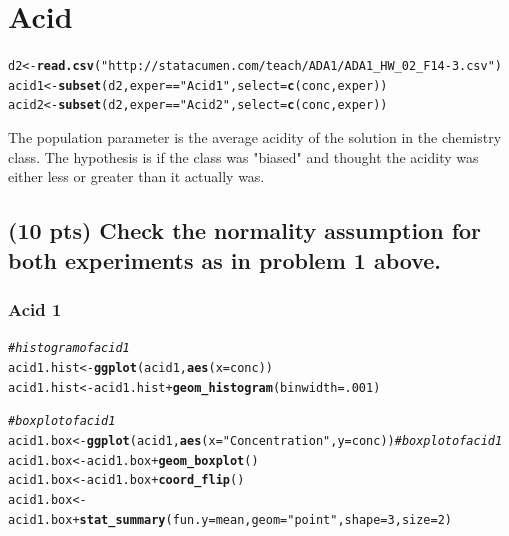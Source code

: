 \documentclass{article}\usepackage[]{graphicx}\usepackage[]{color}
\makeatletter
\newcommand{\hlnum}[1]{\textcolor[rgb]{0.686,0.059,0.569}{#1}}%
\newcommand{\hlstr}[1]{\textcolor[rgb]{0.192,0.494,0.8}{#1}}%
\newcommand{\hlcom}[1]{\textcolor[rgb]{0.678,0.584,0.686}{\textit{#1}}}%
\newcommand{\hlopt}[1]{\textcolor[rgb]{0,0,0}{#1}}%
\newcommand{\hlstd}[1]{\textcolor[rgb]{0.345,0.345,0.345}{#1}}%
\newcommand{\hlkwb}[1]{\textcolor[rgb]{0.69,0.353,0.396}{#1}}%
\newcommand{\hlkwc}[1]{\textcolor[rgb]{0.333,0.667,0.333}{#1}}%
\newcommand{\hlkwd}[1]{\textcolor[rgb]{0.737,0.353,0.396}{\textbf{#1}}}%
\newenvironment{kframe}{%
 \def\at@end@of@kframe{}%
 \ifinner\ifhmode%
  \def\at@end@of@kframe{\end{minipage}}%
  \begin{minipage}{\columnwidth}%
 \fi\fi%
 \def\FrameCommand##1{\hskip\@totalleftmargin \hskip-\fboxsep
 \colorbox{shadecolor}{##1}\hskip-\fboxsep
     \hskip-\linewidth \hskip-\@totalleftmargin \hskip\columnwidth}%
 \MakeFramed {\advance\hsize-\width
   \@totalleftmargin\z@ \linewidth\hsize
   \@setminipage}}%
 {\par\unskip\endMakeFramed%
 \at@end@of@kframe}
\newenvironment{knitrout}{}{} %
\makeatother
\begin{document}

\section{Acid}
\begin{knitrout}
\color{fgcolor}\begin{kframe}
\begin{alltt}
\hlstd{d2} \hlkwb{<-} \hlkwd{read.csv}\hlstd{(}\hlstr{"http://statacumen.com/teach/ADA1/ADA1_HW_02_F14-3.csv"}\hlstd{)}
\hlstd{acid1} \hlkwb{<-} \hlkwd{subset}\hlstd{(d2,exper} \hlopt{==}\hlstr{"Acid1"}\hlstd{,} \hlkwc{select} \hlstd{=} \hlkwd{c}\hlstd{(conc,exper))}
\hlstd{acid2} \hlkwb{<-} \hlkwd{subset}\hlstd{(d2,exper} \hlopt{==}\hlstr{"Acid2"}\hlstd{,} \hlkwc{select} \hlstd{=} \hlkwd{c}\hlstd{(conc,exper))}
\end{alltt}
\end{kframe}
\end{knitrout}

The population parameter is the average acidity of the solution in the chemistry class.  The hypothesis is if the class was "biased" and thought the acidity was either less or greater than
it actually was.

\subsection{(10 pts) Check the normality assumption for both experiments as in problem 1 above.}
\subsubsection{Acid 1}

\begin{knitrout}
\color{fgcolor}\begin{kframe}
\begin{alltt}
\hlcom{# histogram of acid1}
\hlstd{acid1.hist} \hlkwb{<-} \hlkwd{ggplot}\hlstd{(acid1,} \hlkwd{aes}\hlstd{(}\hlkwc{x} \hlstd{= conc))}
\hlstd{acid1.hist} \hlkwb{<-} \hlstd{acid1.hist} \hlopt{+} \hlkwd{geom_histogram}\hlstd{(}\hlkwc{binwidth} \hlstd{=} \hlnum{.001}\hlstd{)}

\hlcom{# boxplot of acid1}
\hlstd{acid1.box} \hlkwb{<-} \hlkwd{ggplot}\hlstd{(acid1,} \hlkwd{aes}\hlstd{(}\hlkwc{x} \hlstd{=} \hlstr{"Concentration"}\hlstd{,} \hlkwc{y} \hlstd{= conc))} \hlcom{# boxplot of acid1}
\hlstd{acid1.box} \hlkwb{<-} \hlstd{acid1.box} \hlopt{+} \hlkwd{geom_boxplot}\hlstd{()}
\hlstd{acid1.box} \hlkwb{<-} \hlstd{acid1.box} \hlopt{+} \hlkwd{coord_flip}\hlstd{()}
\hlstd{acid1.box} \hlkwb{<-} \hlstd{acid1.box} \hlopt{+} \hlkwd{stat_summary}\hlstd{(}\hlkwc{fun.y} \hlstd{= mean,} \hlkwc{geom} \hlstd{=} \hlstr{"point"}\hlstd{,} \hlkwc{shape} \hlstd{=} \hlnum{3}\hlstd{,} \hlkwc{size} \hlstd{=} \hlnum{2}\hlstd{)}
\end{alltt}
\end{kframe}
\end{knitrout}
\end{document}
